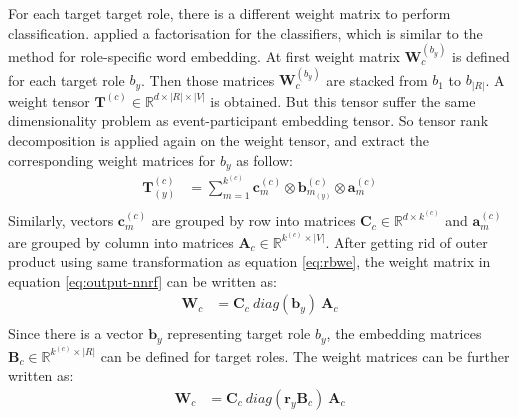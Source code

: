 \documentclass[a4paper]{article}
\begin{document}
For each target target role, there is a different weight matrix to perform classification. \citet{tilk2016event} applied a factorisation for the classifiers, which is similar to the method for role-specific word embedding. At first weight matrix $\mathbf{W}_c^{(b_y)}$ is defined for each target role $b_y$. Then those matrices $\mathbf{W}_c^{(b_y)}$ are stacked from $b_1$ to $b_{|R|}$. A weight tensor $\mathbf{T}^{(c)} \in \mathbb{R}^{d \times |R| \times |V|}$ is obtained. But this tensor suffer the same dimensionality problem as event-participant embedding tensor. So tensor rank decomposition is applied again on the weight tensor, and extract the corresponding weight matrices for $b_y$ as follow: 
\begin{equation} \label{eq:trd-cls}
\begin{aligned}
    \mathbf{T}_{(y)}^{(c)}
        &= \sum_{m=1}^{k^{(c)}} \mathbf{c}_{m}^{(c)} \otimes \mathbf{b}_{m_{(y)}}^{(c)} \otimes \mathbf{a}_m^{(c)} \\
\end{aligned}
\end{equation}
Similarly, vectors $\mathbf{c}_{m}^{(c)}$ are grouped by row into matrices $\mathbf{C}_c \in \mathbb{R}^{d \times k^{(c)}}$ and $\mathbf{a}_m^{(c)}$ are grouped by column into matrices $\mathbf{A}_c \in \mathbb{R}^{k^{(c)} \times |V|}$. After getting rid of outer product using same transformation as equation \eqref{eq:rbwe}, the weight matrix in equation \eqref{eq:output-nnrf}  can be written as:
\begin{equation} \label{eq:cls}
\begin{aligned}
    \mathbf{W}_c
        &= \mathbf{C}_c \ diag(\mathbf{b}_y) \ \mathbf{A}_c \\
\end{aligned}
\end{equation}
Since there is a vector $\mathbf{b}_y$ representing target role $b_y$, the embedding matrices $\mathbf{B}_c \in \mathbb{R}^{k^{(c)} \times |R|}$ can be defined for target roles. The weight matrices can be further written as:
\begin{equation} \label{eq:cls-temb}
\begin{aligned}
    \mathbf{W}_c
        &= \mathbf{C}_c \ diag(\mathbf{r}_y \mathbf{B}_c) \ \mathbf{A}_c \\
\end{aligned}
\end{equation}
\end{document}
